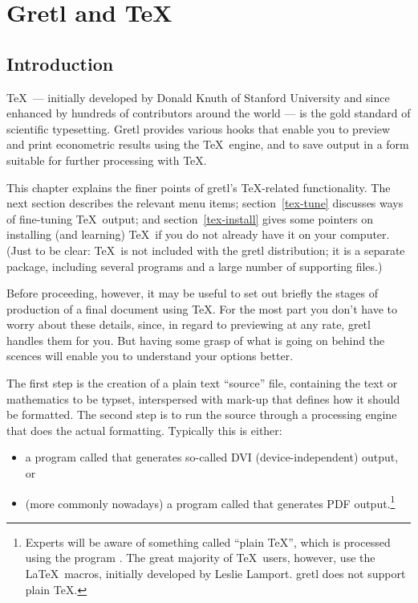 \chapter{Gretl and \TeX}
\label{gretltex}


\section{Introduction}
\label{tex-intro}

\TeX\ --- initially developed by Donald Knuth of Stanford University
and since enhanced by hundreds of contributors around the world --- is
the gold standard of scientific typesetting.  Gretl provides
various hooks that enable you to preview and print econometric results
using the \TeX\ engine, and to save output in a form suitable for
further processing with \TeX.

This chapter explains the finer points of gretl's \TeX-related
functionality.  The next section describes the relevant menu items;
section~\ref{tex-tune} discusses ways of fine-tuning \TeX\ output; and
section~\ref{tex-install} gives some pointers on installing (and
learning) \TeX\ if you do not already have it on your computer.  (Just
to be clear: \TeX\ is not included with the gretl distribution;
it is a separate package, including several programs and a large
number of supporting files.)

Before proceeding, however, it may be useful to set out briefly the
stages of production of a final document using \TeX.  For the most
part you don't have to worry about these details, since, in regard to
previewing at any rate, gretl handles them for you.  But having
some grasp of what is going on behind the scences will enable you to
understand your options better.

The first step is the creation of a plain text ``source'' file,
containing the text or mathematics to be typset, interspersed with
mark-up that defines how it should be formatted.  The second step is
to run the source through a processing engine that does the actual
formatting.  Typically this is either:
\begin{itemize}
\item a program called  that generates so-called DVI
  (device-independent) output, or
\item (more commonly nowadays) a program called  that
  generates PDF output.\footnote{Experts will be aware of something
    called ``plain \TeX'', which is processed using the program
    .  The great majority of \TeX\ users, however, use the
    \LaTeX\ macros, initially developed by Leslie Lamport.
    gretl does not support plain \TeX.}
\end{itemize}

